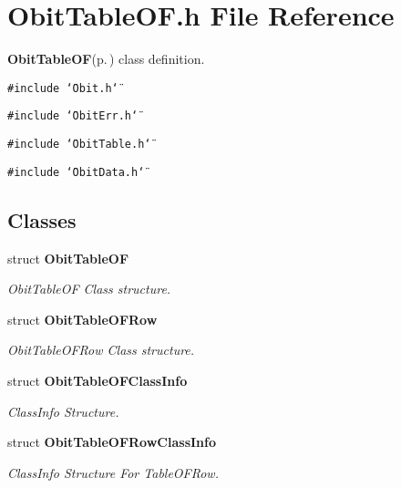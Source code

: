 \section{Obit\-Table\-OF.h File Reference}
\label{ObitTableOF_8h}
{\bf Obit\-Table\-OF}{\rm (p.\,\pageref{structObitTableOF})} class definition. 

{\tt \#include \char`\"{}Obit.h\char`\"{}}\par
{\tt \#include \char`\"{}Obit\-Err.h\char`\"{}}\par
{\tt \#include \char`\"{}Obit\-Table.h\char`\"{}}\par
{\tt \#include \char`\"{}Obit\-Data.h\char`\"{}}\par
\subsection*{Classes}
\begin{CompactItemize}
\item 
struct {\bf Obit\-Table\-OF}
\begin{CompactList}\small\item\em Obit\-Table\-OF Class structure. \item\end{CompactList}\item 
struct {\bf Obit\-Table\-OFRow}
\begin{CompactList}\small\item\em Obit\-Table\-OFRow Class structure. \item\end{CompactList}\item 
struct {\bf Obit\-Table\-OFClass\-Info}
\begin{CompactList}\small\item\em Class\-Info Structure. \item\end{CompactList}\item 
struct {\bf Obit\-Table\-OFRow\-Class\-Info}
\begin{CompactList}\small\item\em Class\-Info Structure For Table\-OFRow. \item\end{CompactList}\end{CompactItemize}
